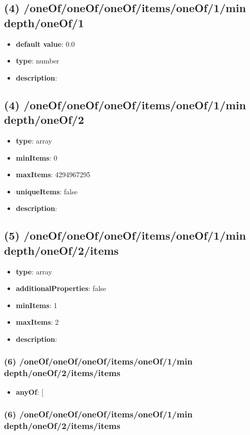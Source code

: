 \subsection{(4) /oneOf/oneOf/oneOf/items/oneOf/1/min depth/oneOf/1}
\begin{itemize}[leftmargin=4em]\item {\bf default value}: 0.0
\item {\bf type}: number
\item {\bf description}: 
\end{itemize}\subsection{(4) /oneOf/oneOf/oneOf/items/oneOf/1/min depth/oneOf/2}
\begin{itemize}[leftmargin=4em]\item {\bf type}: array
\item {\bf minItems}: 0
\item {\bf maxItems}: 4294967295
\item {\bf uniqueItems}: false
\item {\bf description}: 
\end{itemize}\subsection{(5) /oneOf/oneOf/oneOf/items/oneOf/1/min depth/oneOf/2/items}
\begin{itemize}[leftmargin=5em]\item {\bf type}: array
\item {\bf additionalProperties}: false
\item {\bf minItems}: 1
\item {\bf maxItems}: 2
\item {\bf description}: 
\end{itemize}\subsubsection{(6) /oneOf/oneOf/oneOf/items/oneOf/1/min depth/oneOf/2/items/items}
\begin{itemize}[leftmargin=6em]\item {\bf anyOf}: [\end{itemize}\subsubsection{(6) /oneOf/oneOf/oneOf/items/oneOf/1/min depth/oneOf/2/items/items}
